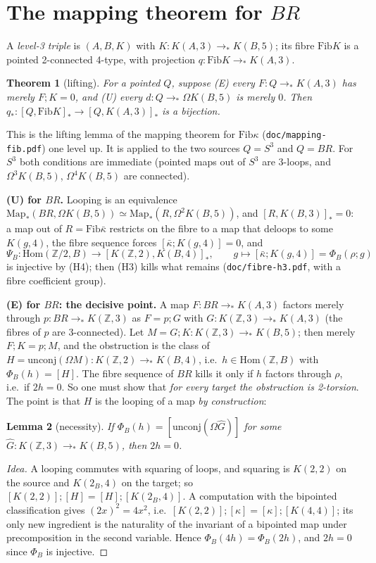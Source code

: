 \documentclass[11pt]{amsart}
\newtheorem{theorem}{Theorem}
\newtheorem{lemma}[theorem]{Lemma}
\theoremstyle{definition}
\theoremstyle{remark}
\newcommand{\Om}{\Omega}
\newcommand{\Map}{\mathrm{Map}_*}
\newcommand{\Z}{\mathbb{Z}}
\newcommand{\code}[1]{\texttt{#1}}
\newcommand{\Hom}{\mathrm{Hom}}
\newcommand{\hc}[2]{[#1,#2]_*}
\newcommand{\Fib}{\mathrm{Fib}}
\newcommand{\cls}[1]{[#1]}
\newcommand{\kb}{\bar\kappa}
\newcommand{\ucj}{\mathrm{unconj}}
\begin{document}
\section{The mapping theorem for $BR$}

A \emph{level-3 triple} is $(A,B,K)$ with $K:K(A,3)\to_*K(B,5)$; its fibre $\Fib K$ is
a pointed 2-connected 4-type, with projection $q:\Fib K\to_*K(A,3)$.

\begin{theorem}[lifting]\label{t:lift}
For a pointed $Q$, suppose (E) every $F:Q\to_*K(A,3)$ has merely $F;K=0$, and (U) every
$d:Q\to_*\Om K(B,5)$ is merely $0$. Then $q_*:\hc Q{\Fib K}\to\hc Q{K(A,3)}$ is a bijection.
\end{theorem}

This is the lifting lemma of the mapping theorem for $\Fib\kappa$
(\code{doc/mapping-fib.pdf}) one level up. It is applied to the two sources $Q=S^3$ and
$Q=BR$. For $S^3$ both conditions are immediate (pointed maps out of $S^3$ are 3-loops,
and $\Om^3K(B,5)$, $\Om^4K(B,5)$ are connected).

\noindent\textbf{(U) for $BR$.} Looping is an equivalence
$\Map(BR,\Om K(B,5))\simeq\Map(R,\Om^2K(B,5))$, and $\hc R{K(B,3)}=0$: a map out of
$R=\Fib\kb$ restricts on the fibre to a map that deloops to some $K(g,4)$, the fibre
sequence forces $\cls{\kb;K(g,4)}=0$, and
\[\Psi_B:\Hom(\Z/2,B)\to\hc{K(\Z,2)}{K(B,4)},\qquad g\mapsto\cls{\kb;K(g,4)}=\Phi_B(\rho;g)\]
is injective by (H4); then (H3) kills what remains (\code{doc/fibre-h3.pdf}, with a fibre
coefficient group).

\noindent\textbf{(E) for $BR$: the decisive point.} A map $F:BR\to_*K(A,3)$ factors merely
through $p:BR\to_*K(\Z,3)$ as $F=p;G$ with $G:K(\Z,3)\to_*K(A,3)$ (the fibres of $p$ are
3-connected). Let $M=G;K:K(\Z,3)\to_*K(B,5)$; then merely $F;K=p;M$, and the obstruction
is the class of $H=\ucj(\Om M):K(\Z,2)\to_*K(B,4)$, i.e.\ $h\in\Hom(\Z,B)$ with
$\Phi_B(h)=\cls H$. The fibre sequence of $BR$ kills it only if $h$ factors through
$\rho$, i.e.\ if $2h=0$. So one must show that \emph{for every target the obstruction is
2-torsion}. The point is that $H$ is the looping of a map \emph{by construction}:

\begin{lemma}[necessity]\label{l:N}
If $\Phi_B(h)=\cls{\ucj(\Om\hat G)}$ for some $\hat G:K(\Z,3)\to_*K(B,5)$, then $2h=0$.
\end{lemma}
\begin{proof}[Idea]
A looping commutes with squaring of loops, and squaring is $K(2,2)$ on the source and
$K(2_B,4)$ on the target; so $\cls{K(2,2)};\cls H=\cls H;\cls{K(2_B,4)}$. A computation
with the bipointed classification gives $(2x)^2=4x^2$, i.e.\
$\cls{K(2,2)};\cls\kappa=\cls\kappa;\cls{K(4,4)}$; its only new ingredient is the
naturality of the invariant of a bipointed map under precomposition in the second
variable. Hence $\Phi_B(4h)=\Phi_B(2h)$, and $2h=0$ since $\Phi_B$ is injective.
\end{proof}
\end{document}
